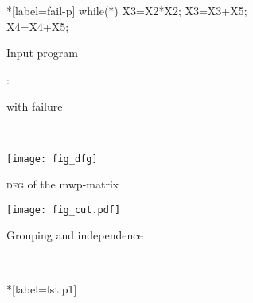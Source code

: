 \begin{figure}
\centering
\begin{subfigure}[t]{.25\textwidth}
\begin{minipage}{\textwidth}
\begin{implisting}*[label=fail-p]
while(*) {
  X3=X2*X2;
  X3=X3+X5;
  X4=X4+X5; }
\end{implisting}
\end{minipage}
\caption{Input program}\label{lst:whole-p}
\end{subfigure}%
\begin{subfigure}[t]{.75\textwidth}
\hfill{}:{}\hfill{}
\caption{ with failure}\label{fig:fail-matrix}
\end{subfigure} \\[1em]
\begin{subfigure}{.45\textwidth}
\centering
\texttt{[image: fig\_dfg]}
\caption{\textsc{dfg} of the mwp-matrix}\label{fig:fail-dfg}
\end{subfigure}\hfill%
\begin{subfigure}{.45\textwidth}
\centering
\texttt{[image: fig\_cut.pdf]}
\caption{Grouping and independence}\label{fig:group-part}
\end{subfigure} \\[1em]
\begin{subfigure}{\textwidth}{
\centering
\begin{minipage}{.35\textwidth}
\begin{implisting}*[label={lst:p1}]

\end{implisting}
\end{minipage}}
\end{subfigure}
\end{figure}
